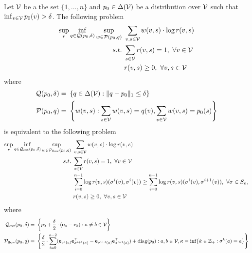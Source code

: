 \begin{corollary}[Equivalence]\label{cor:equiv}
Let $\mathcal{V}$ be a the set $\{1,\dots,n\}$ and $p_0 \in \Delta(\mathcal{V})$ be a distribution over $\mathcal{V}$ such that $\inf_{v \in \mathcal{V}}p_0(v) > \delta$. The following problem
\begin{align*}
    \sup_{r} \inf_{q \in \mathcal{Q}(p_0,\delta)} \sup_{w \in \mathcal{P}(p_0,q)} &~  \sum_{v,s \in \mathcal{V}} w(v,s) \cdot \log r(v,s) \\
    s.t. &~ \sum_{s \in \mathcal{V}} r(v,s) = 1, ~ \forall v \in \mathcal{V}\\
    &~ r(v,s) \geq 0,~ \forall v,s \in \mathcal{V} \notag 
\end{align*}
where 
\begin{align*}
    \mathcal{Q}(p_0,\delta) = &~ \left\{q \in \Delta(\mathcal{V}): \|q - p_0\|_1 \leq \delta\right\} \\
    \mathcal{P}(p_0,q) = &~ \left\{w(v,s): \sum_{s \in \mathcal{V}}w(v,s) = q(v), \sum_{v  \in \mathcal{V}}w(v,s) =  p_0(s)\right\}
\end{align*}
is equivalent to the following problem
\begin{align*}
    \sup_{r} \inf_{q \in \mathcal{Q}_{\text{ext}}(p_0,\delta)} \sup_{w \in \mathcal{P}_{\text{flow}}(p_0,q)} &~  \sum_{v,s \in \mathcal{V}} w(v,s) \cdot \log r(v,s) \\
    s.t. &~ \sum_{s \in \mathcal{V}} r(v,s) = 1, ~ \forall v \in \mathcal{V}\\
    &~ \sum_{i=0}^{n-1} \log r(v,s)(\sigma^i(v),\sigma^i(v)) \geq \sum_{i=0}^{n-1} \log r(v,s)(\sigma^i(v),\sigma^{i+1}(v)), ~\forall \sigma  \in S_n,\\
    &~ r(v,s) \geq 0,~ \forall v,s \in \mathcal{V} \notag 
\end{align*}
where 
\begin{align*}
    \mathcal{Q}_{\mathrm{ext}}(p_0,\delta) = &~ \left\{p_0 + \frac{\delta}{2}\cdot (\mathbf{e}_a - \mathbf{e}_b): a \neq b \in \mathcal{V}\right\} \\
    \mathcal{P}_{\mathrm{flow}}(p_0,q) = &~ \left\{\frac{\delta}{2} \cdot \sum_{i=0}^{\kappa-2} (\mathbf{e}_{\sigma^{i}(a)}\mathbf{e}_{\sigma^{i+1}(a)}^\top - \mathbf{e}_{\sigma^{i+1}(a)}\mathbf{e}_{\sigma^{i+1}(a)}^\top) + \mathrm{diag}(p_0): a,b \in \mathcal{V}, \kappa = \inf \{k \in \mathbb{Z}_+: \sigma^k(a) = a\}\right\}
\end{align*}
\end{corollary}

